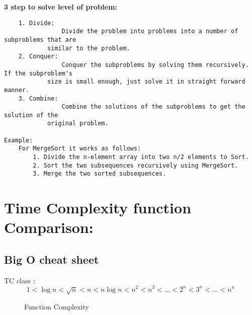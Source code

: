 \documentclass{article}
\begin{document}
\textbf{3 step to solve level of problem:}

\begin{verbatim}
    1. Divide:
                Divide the problem into problems into a number of subproblems that are
            similar to the problem.
    2. Conquer:
                Conquer the subproblems by solving them recursively. If the subproblem's
            size is small enough, just solve it in straight forward manner.
    3. Combine:
                Combine the solutions of the subproblems to get the solution of the
            original problem.

Example:
    For MergeSort it works as follows:
        1. Divide the n-element array into two n/2 elements to Sort.
        2. Sort the two subsequences recursively using MergeSort.
        3. Merge the two sorted subsequences.
\end{verbatim}
\hrulefill
\newpage

\section*{Time Complexity function Comparison:}
\subsection*{Big O cheat sheet}
TC class :
\[1 < \log n < \sqrt{n} < n < n \log n < n^2 < n^3 < \ldots < 2^n < 3^n < \ldots < n^n\]

\pgfplotsset{width=12cm,compat=1.18}
\begin{figure}[h]
    \centering
    \caption{Function Complexity}
    \label{fig:function_complexity}
\end{figure}
\end{document}
